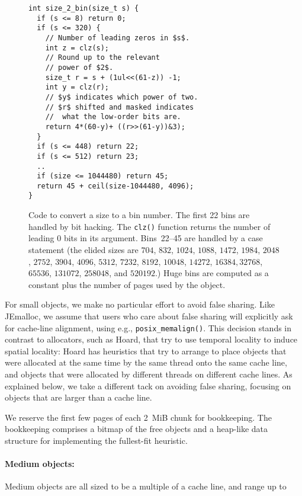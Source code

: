 \documentclass[pldi]{sigplanconf-pldi15}
\def\code{\lstinline[basicstyle=\ttfamily]}
\begin{document}
\begin{figure}
\begin{verbatim}
int size_2_bin(size_t s) {
  if (s <= 8) return 0;
  if (s <= 320) {
    // Number of leading zeros in $s$.
    int z = clz(s);
    // Round up to the relevant
    // power of $2$.
    size_t r = s + (1ul<<(61-z)) -1;
    int y = clz(r);
    // $y$ indicates which power of two.
    // $r$ shifted and masked indicates
    //  what the low-order bits are.
    return 4*(60-y)+ ((r>>(61-y))&3);
  }
  if (s <= 448) return 22;
  if (s <= 512) return 23;
  ..
  if (size <= 1044480) return 45;
  return 45 + ceil(size-1044480, 4096);
}
\end{verbatim}
\caption{Code to convert a size to a bin number.  The first 22 bins
  are handled by bit hacking. The \code{clz()} function returns the
  number of leading 0 bits in its argument. Bins~22--45 are handled by
  a case statement (the elided sizes are $704$, $832$, $1024$, $1088$,
  $1472$, $1984$, $2048$, $2752$, $3904$, $4096$, $5312$, $7232$,
  $8192$, $10048$, $14272$, $16384, 32768$, $65536$, $131072$,
  $258048$, and $520192$.)  Huge bins are computed as a constant plus
  the number of pages used by the object.}
\label{fig:size2bin}
\end{figure}

For small objects, we make no particular effort to avoid false
sharing.  Like JEmalloc, we assume that users who care about false
sharing will explicitly ask for cache-line alignment, using e.g.,
\code{posix_memalign()}.  This decision stands in contrast to
allocators, such as Hoard, that try to use temporal locality to induce
spatial locality: Hoard has heuristics that try to arrange to place
objects that were allocated at the same time by the same thread onto
the same cache line, and objects that were allocated by different
threads on different cache lines.  As explained below, we take a
different tack on avoiding false sharing, focusing on objects that are
larger than a cache line.


We reserve the first few pages of each 2~MiB chunk for bookkeeping.
The bookkeeping comprises a bitmap of the free objects and a heap-like
data structure for implementing the fullest-fit
heuristic. 


{\paragraph{Medium objects:}} Medium objects are all sized to be a
multiple of a cache line, and range up to
\end{document}
